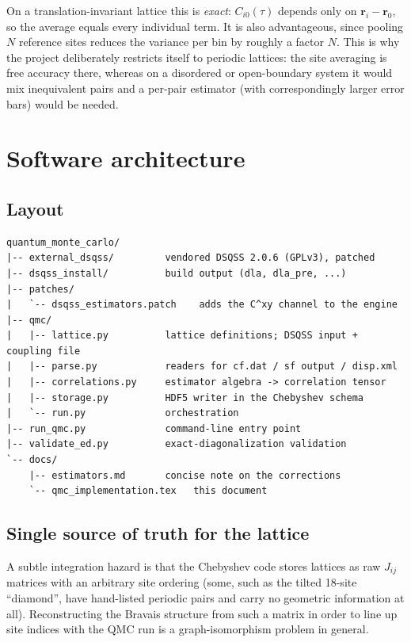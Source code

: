 \documentclass[11pt,a4paper]{article}
\begin{document}
On a translation-invariant lattice this is \emph{exact}: $C_{i0}(\tau)$ depends
only on $\mathbf{r}_i-\mathbf{r}_0$, so the average equals every individual term.
It is also advantageous, since pooling $N$ reference sites reduces the variance
per bin by roughly a factor $N$. This is why the project deliberately restricts
itself to periodic lattices: the site averaging is free accuracy there, whereas
on a disordered or open-boundary system it would mix inequivalent pairs and a
per-pair estimator (with correspondingly larger error bars) would be needed.

\section{Software architecture}

\subsection{Layout}

\begin{lstlisting}
quantum_monte_carlo/
|-- external_dsqss/         vendored DSQSS 2.0.6 (GPLv3), patched
|-- dsqss_install/          build output (dla, dla_pre, ...)
|-- patches/
|   `-- dsqss_estimators.patch    adds the C^xy channel to the engine
|-- qmc/
|   |-- lattice.py          lattice definitions; DSQSS input + coupling file
|   |-- parse.py            readers for cf.dat / sf output / disp.xml
|   |-- correlations.py     estimator algebra -> correlation tensor
|   |-- storage.py          HDF5 writer in the Chebyshev schema
|   `-- run.py              orchestration
|-- run_qmc.py              command-line entry point
|-- validate_ed.py          exact-diagonalization validation
`-- docs/
    |-- estimators.md       concise note on the corrections
    `-- qmc_implementation.tex   this document
\end{lstlisting}

\subsection{Single source of truth for the lattice}

A subtle integration hazard is that the Chebyshev code stores lattices as raw
$J_{ij}$ matrices with an arbitrary site ordering (some, such as the tilted
18-site ``diamond'', have hand-listed periodic pairs and carry no geometric
information at all). Reconstructing the Bravais structure from such a matrix in
order to line up site indices with the QMC run is a graph-isomorphism problem in
general.
\end{document}

